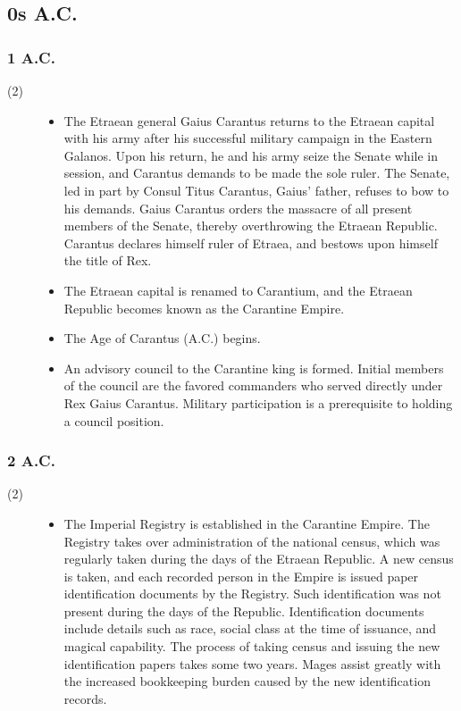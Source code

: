 \documentclass[a4paper, 11pt]{article}
\def\level#1{\item[(#1)\hspace{9.5pt}]}
\newenvironment{knowlevels}{\begin{description}}{\end{description}} %
\def\decadeblk#1{\subsection{#1}}
\def\yearblk#1{\subsubsection{#1}}
\begin{document}
\decadeblk{0s A.C.}
\yearblk{1 A.C.}
\begin{knowlevels}
\level{2} {
\begin{itemize}
\item The Etraean general Gaius Carantus returns to the Etraean capital with his army after his successful military campaign in the Eastern Galanos.  Upon his return, he and his army seize the Senate while in session, and Carantus demands to be made the sole ruler.  The Senate, led in part by Consul Titus Carantus, Gaius' father, refuses to bow to his demands.  Gaius Carantus orders the massacre of all present members of the Senate, thereby overthrowing the Etraean Republic.  Carantus declares himself ruler of Etraea, and bestows upon himself the title of Rex.

\item The Etraean capital is renamed to Carantium, and the Etraean Republic becomes known as the Carantine Empire.

\item The Age of Carantus (A.C.) begins.

\item An advisory council to the Carantine king is formed.  Initial members of the council are the favored commanders who served directly under Rex Gaius Carantus.  Military participation is a prerequisite to holding a council position.
\end{itemize}
}
\end{knowlevels}

\yearblk{2 A.C.}
\begin{knowlevels}
\level{2} {
\begin{itemize}
\item  The Imperial Registry is established in the Carantine Empire.  The Registry takes over administration of the national census, which was regularly taken during the days of the Etraean Republic.  A new census is taken, and each recorded person in the Empire is issued paper identification documents by the Registry.  Such identification was not present during the days of the Republic.  Identification documents include details such as race, social class at the time of issuance, and magical capability.  The process of taking census and issuing the new identification papers takes some two years.  Mages assist greatly with the increased bookkeeping burden caused by the new identification records.
\end{itemize}
}
\end{knowlevels}
\end{document}
